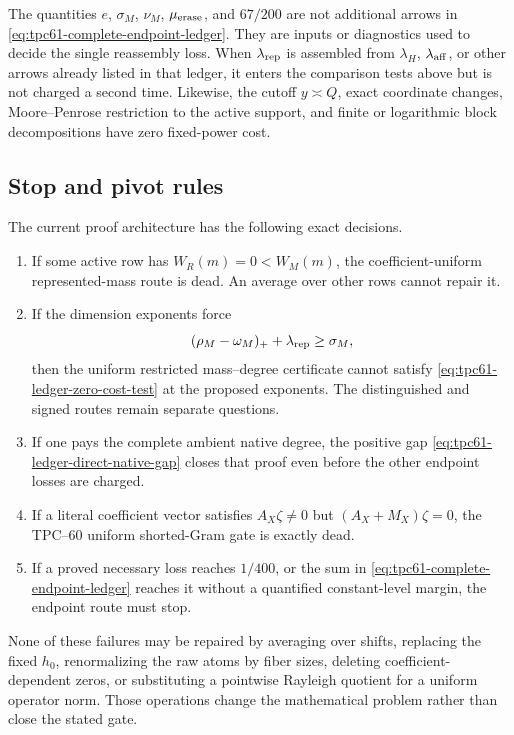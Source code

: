 The quantities \(e\), \(\sigma_M\), \(\nu_M\),
\(\mu_{\rm erase}\), and \(67/200\) are not additional arrows in
\eqref{eq:tpc61-complete-endpoint-ledger}.  They are inputs or diagnostics
used to decide the single reassembly loss.  When \(\lambda_{\rm rep}\) is
assembled from \(\lambda_H\), \(\lambda_{\rm aff}\), or other arrows already
listed in that ledger, it enters the comparison tests above but is not charged
a second time.  Likewise, the cutoff
\(y\asymp Q\), exact coordinate changes, Moore--Penrose restriction to the
active support, and finite or logarithmic block decompositions have zero
fixed-power cost.

\subsection{Stop and pivot rules}

The current proof architecture has the following exact decisions.
\begin{enumerate}[leftmargin=2.3em]
 \item If some active row has \(W_R(m)=0<W_M(m)\), the
       coefficient-uniform represented-mass route is dead.  An average over
       other rows cannot repair it.
 \item If the dimension exponents force
       \[
        (\rho_M-\omega_M)_++\lambda_{\rm rep}\ge\sigma_M,
       \]
       then the uniform restricted mass--degree certificate cannot satisfy
       \eqref{eq:tpc61-ledger-zero-cost-test} at the proposed exponents.
       The distinguished and signed routes remain separate questions.
 \item If one pays the complete ambient native degree, the positive gap
       \eqref{eq:tpc61-ledger-direct-native-gap} closes that proof even
       before the other endpoint losses are charged.
 \item If a literal coefficient vector satisfies
       \(A_X\zeta\ne0\) but \((A_X+M_X)\zeta=0\), the TPC--60 uniform
       shorted-Gram gate is exactly dead.
 \item If a proved necessary loss reaches \(1/400\), or the sum in
       \eqref{eq:tpc61-complete-endpoint-ledger} reaches it without a
       quantified constant-level margin, the endpoint route must stop.
\end{enumerate}

None of these failures may be repaired by averaging over shifts, replacing
the fixed \(h_0\), renormalizing the raw atoms by fiber sizes, deleting
coefficient-dependent zeros, or substituting a pointwise Rayleigh quotient
for a uniform operator norm.  Those operations change the mathematical
problem rather than close the stated gate.
